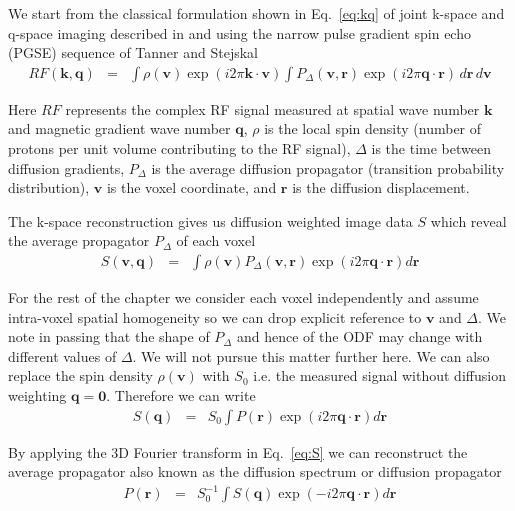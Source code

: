 \documentclass{bioinfo}
\begin{document}
We start from the classical formulation shown in Eq.~\ref{eq:kq}
of joint k-space and q-space imaging described in \citet{Callaghan1991OUP} and
\citet{callaghan1988nmr} using the narrow pulse gradient spin echo
(PGSE) sequence of Tanner and Stejskal \begin{eqnarray}
RF(\mathbf{k},\mathbf{q}) & = & \int\rho(\mathbf{v})\exp(i2\pi\mathbf{k}\cdot\mathbf{v})\int P_{\Delta}(\mathbf{v},\mathbf{r})\exp(i2\pi\mathbf{q}\cdot\mathbf{r})\, d\mathbf{r\,}d\mathbf{v}\label{eq:kq}\end{eqnarray}


\noindent Here $RF$ represents the complex RF signal measured at
spatial wave number $\mathbf{k}$ and magnetic gradient wave number
$\mathbf{q}$, $\rho$ is the local spin density (number of protons
per unit volume contributing to the RF signal), $\Delta$ is the time
between diffusion gradients, $P_{\Delta}$ is the average diffusion
propagator (transition probability distribution), \textbf{$\mathbf{v}$}
is the voxel coordinate, and $\mathbf{r}$ is the diffusion displacement. 

The k-space reconstruction gives us diffusion weighted image data
$S$ which reveal the average propagator $P_{\Delta}$ of each voxel
\begin{eqnarray}
S(\mathbf{v},\mathbf{q}) & = & \int\rho(\mathbf{v})P_{\Delta}(\mathbf{v},\mathbf{r})\exp(i2\pi\mathbf{q}\cdot\mathbf{r})d\mathbf{r}\label{eq:W}\end{eqnarray}


For the rest of the chapter we consider each voxel independently and
assume intra-voxel spatial homogeneity so we can drop explicit reference
to $\mathbf{v}$ and $\Delta$. We note in passing that the shape
of $P_{\Delta}$ and hence of the ODF may change with different values
of $\Delta$. We will not pursue this matter further here. We can
also replace the spin density \foreignlanguage{british}{$\rho(\mathbf{v})$}
with $S_{0}$ i.e. the measured signal without diffusion weighting
$\mathbf{q}=\mathbf{0}$. Therefore we can write\begin{eqnarray}
S(\mathbf{q}) & = & S_{0}\int P(\mathbf{r})\exp(i2\pi\mathbf{q}\cdot\mathbf{r})d\mathbf{r}\label{eq:S}\end{eqnarray}


By applying the 3D Fourier transform in Eq.~\ref{eq:S} we can reconstruct
the average propagator also known as the diffusion spectrum \citep{Wedeen}
or diffusion propagator\begin{eqnarray}
P(\mathbf{r}) & = & S_{0}^{-1}\int S(\mathbf{q})\exp(-i2\pi\mathbf{q}\cdot\mathbf{r})d\mathbf{r}\label{eq:P}\end{eqnarray}
\end{document}
